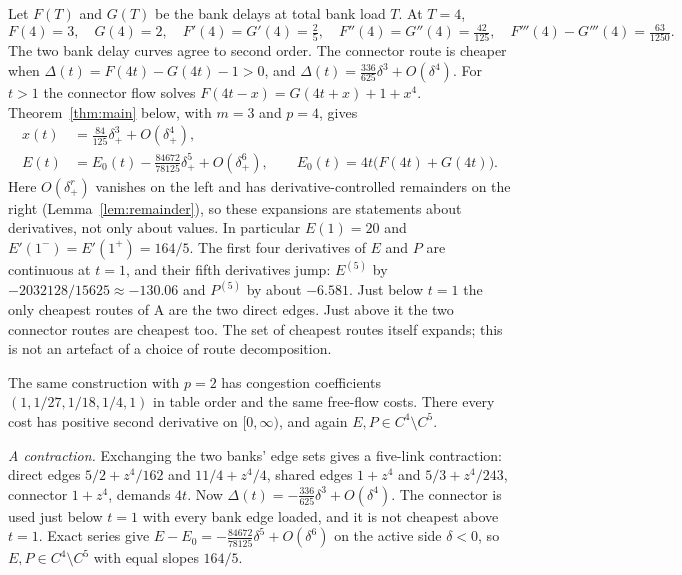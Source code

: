 Let $F(T)$ and $G(T)$ be the bank delays at total bank load $T$. At $T=4$,
\begin{equation}\label{eq:quinticjets}
 F(4)=3,\quad G(4)=2,\quad F'(4)=G'(4)=\tfrac25,\quad
 F''(4)=G''(4)=\tfrac{42}{125},\quad F'''(4)-G'''(4)=\tfrac{63}{1250}.
\end{equation}
The two bank delay curves agree to second order. The connector route is cheaper when $\Delta(t)=F(4t)-G(4t)-1>0$, and $\Delta(t)=\tfrac{336}{625}\delta^3+O(\delta^4)$. For $t>1$ the connector flow solves $F(4t-x)=G(4t+x)+1+x^4$. Theorem~\ref{thm:main} below, with $m=3$ and $p=4$, gives
\begin{align}
 x(t)&=\tfrac{84}{125}\delta_+^3+O(\delta_+^4),\label{eq:fivex}\\
 E(t)&=E_0(t)-\tfrac{84672}{78125}\delta_+^5+O(\delta_+^6),\qquad E_0(t)=4t\bigl(F(4t)+G(4t)\bigr).\label{eq:fiveE}
\end{align}
Here $O(\delta_+^r)$ vanishes on the left and has derivative-controlled remainders on the right (Lemma~\ref{lem:remainder}), so these expansions are statements about derivatives, not only about values. In particular $E(1)=20$ and $E'(1^-)=E'(1^+)=164/5$. The first four derivatives of $E$ and $P$ are continuous at $t=1$, and their fifth derivatives jump: $E^{(5)}$ by $-2032128/15625\approx-130.06$ and $P^{(5)}$ by about $-6.581$. Just below $t=1$ the only cheapest routes of A are the two direct edges. Just above it the two connector routes are cheapest too. The set of cheapest routes itself expands; this is not an artefact of a choice of route decomposition. 

The same construction with $p=2$ has congestion coefficients $(1,1/27,1/18,1/4,1)$ in table order and the same free-flow costs. There every cost has positive second derivative on $[0,\infty)$, and again $E,P\in C^4\setminus C^5$.

\emph{A contraction.} Exchanging the two banks' edge sets gives a five-link contraction: direct edges $5/2+z^4/162$ and $11/4+z^4/4$, shared edges $1+z^4$ and $5/3+z^4/243$, connector $1+z^4$, demands $4t$. Now $\Delta(t)=-\tfrac{336}{625}\delta^3+O(\delta^4)$. The connector is used just below $t=1$ with every bank edge loaded, and it is not cheapest above $t=1$. Exact series give $E-E_0=-\tfrac{84672}{78125}\delta^5+O(\delta^6)$ on the active side $\delta<0$, so $E,P\in C^4\setminus C^5$ with equal slopes $164/5$. 

